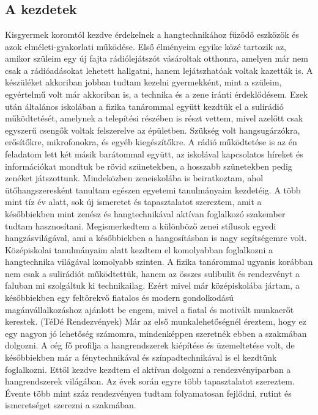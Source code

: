 \chapter{\bevezetes}

\section{A kezdetek}

Kisgyermek koromtól kezdve érdekelnek a hangtechnikához fűződő eszközök és azok elméleti-gyakorlati működése. Első élményeim egyike közé tartozik az, amikor
szüleim egy új fajta rádiólejátszót vásároltak otthonra, amelyen már nem csak a rádióadásokat lehetett hallgatni, hanem lejátszhatóak voltak kazetták is.
A készüléket akkoriban jobban tudtam kezelni gyermekként, mint a szüleim, egyértelmű volt már akkoriban is, a technika és a zene iránti érdeklődésem.
Ezek után általános iskolában a fizika tanárommal együtt kezdtük el a sulirádió működtetését, amelynek a telepítési részében is részt vettem, mivel azelőtt
csak egyszerű csengők voltak felszerelve az épületben. Szükség volt hangsugárzókra, erősítőkre, mikrofonokra, és egyéb kiegészítőkre. A rádió működtetése
is az én feladatom lett két másik barátommal együtt, az iskolával kapcsolatos híreket és információkat mondtuk be rövid szünetekben, a hosszabb szünetekben pedig zenéket játszottunk.
Mindeközben zeneiskolába is beiratkoztam, ahol ütőhangszeresként tanultam egészen egyetemi tanulmányaim kezdetéig. A több mint tíz év alatt, sok új ismeretet és tapasztalatot szereztem,
amit a későbbiekben mint zenész és hangtechnikával aktívan foglalkozó szakember tudtam hasznosítani. Megismerkedtem a különböző zenei stílusok egyedi hangzásvilágával, ami a későbbiekben a hangosításban is nagy segítségemre volt.
Középiskolai tanulmányaim alatt kezdtem el komolyabban foglalkozni a hangtechnika világával komolyabb szinten. 
A fizika tanárommal ugyanis korábban nem csak a sulirádiót működtettük, hanem az összes sulibulit és rendezvényt a faluban mi szolgáltuk ki technikailag.
Ezért mivel már középiskolába jártam, a későbbiekben egy feltörekvő fiatalos és modern gondolkodású magánvállalkozáshoz ajánlott be engem, mivel a fiatal és motivált munkaerőt kerestek. (TéDé Rendezvények)
Már az első munkalehetőségnél éreztem, hogy ez egy nagyon jó lehetőség számomra, mindenképpen szeretnék ebben a szakmában dolgozni.
A cég fő profilja a hangrendszerek kiépítése és üzemeltetése volt, de későbbiekben már a fénytechnikával és színpadtechnikával is el kezdtünk foglalkozni. 
Ettől kezdve kezdtem el aktívan dolgozni a rendezvényiparban a hangrendszerek világában. Az évek során egyre több tapasztalatot
szereztem. Évente több mint száz rendezvényen tudtam folyamatosan fejlődni, rutint és ismeretséget szerezni a szakmában.

